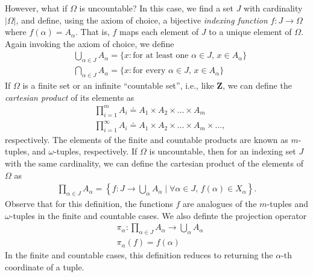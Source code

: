 However, what if $\Omega$ is uncountable? In this case, we find a set $J$ with
cardinality $|\Omega|$, and define, using the axiom of choice, a bijective \emph{indexing function} $f: J
\to \Omega$ where $f(\alpha) = A_{\alpha}$. That is, $f$ maps each element of
$J$ to a unique element of $\Omega$. Again invoking the axiom of choice,
we define
\begin{equation*}
\begin{split}
& \bigcup_{\alpha \in J} A_{\alpha} = \{ x: \text{for at least one $\alpha \in
J$, $x \in A_{\alpha}$}\} \\
& \bigcap_{\alpha \in J} A_{\alpha} = \{ x: \text{for every $\alpha \in
J$, $x \in A_{\alpha}$}\}
\end{split}
\end{equation*}
If $\Omega$ is a finite set or an infinite ``countable set'', i.e., like $\mathbf{Z}$,
we can define the \emph{cartesian product} of its elements as
\begin{equation*}
\begin{split}
& \prod_{i=1}^{m} A_{i} \doteq A_{1} \times A_{2} \times \dots \times A_{m} \\
& \prod_{i =1}^{\infty} A_{i} \doteq A_{1} \times A_{2} \times \dots \times
A_{m} \times \dots,
\end{split}
\end{equation*}
respectively. The elements of the finite and countable products are known as
$m$-tuples, and $\omega$-tuples, respectively.
If $\Omega$ is uncountable, then for an indexing set $J$ with the same
cardinality, we can define the cartesian product of the elements of $\Omega$
as
\begin{equation*}
\begin{split}
\prod_{\alpha \in J} A_{\alpha} = \left\{ f: J \to \bigcup_{\alpha} A_{\alpha} \mid
\forall \alpha \in J, \, f(\alpha) \in X_{\alpha}\right\}.
\end{split}
\end{equation*}
Observe that for this definition, the functions $f$ are analogues of the
$m$-tuples and $\omega$-tuples in the finite and countable cases.
We also definte the projection operator
\begin{equation*}
\begin{split}
& \pi_{\alpha}: \prod_{\alpha \in J} A_{\alpha} \to \bigcup_{\alpha}
A_{\alpha} \\
& \pi_{\alpha}(f) = f(\alpha)
\end{split}
\end{equation*}
In the finite and countable cases, this definition reduces to returning
the $\alpha$-th coordinate of a tuple.
